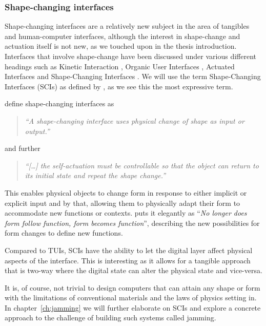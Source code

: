 \subsubsection{Shape-changing interfaces}
Shape-changing interfaces are a relatively new subject in the area of tangibles and human-computer interfaces, although the interest in shape-change and actuation itself is not new, as we touched upon in the thesis introduction.
Interfaces that involve shape-change have been discussed under various different headings such as Kinetic Interaction \citep{parkes2008designing}, Organic User Interfaces \citep{parkes2008designing,holman2008organic}, Actuated Interfaces \citep{poupyrev2007actuation} and Shape-Changing Interfaces \citep{coelho2011shape,rasmussen2012shape}.
We will use the term Shape-Changing Interfaces (SCIs) as defined by \citet{rasmussen2012shape}, as we see this the most expressive term.

\citeauthor{rasmussen2012shape} define shape-changing interfaces as
\begin{quotation}
  \emph{``A shape-changing interface uses physical change of shape as input or output.''}
\end{quotation}
and further
\begin{quotation}
  \emph{``[\ldots] the self-actuation must be controllable so that the object can return to its initial state and repeat the shape change.''}  
\end{quotation}

This enables physical objects to change form in response to either implicit or explicit input and by that, allowing them to physically adapt their form to accommodate new functions or contexts.
\citep{parkes2008designing} puts it elegantly as ``\emph{No longer does form follow function, form becomes function}'', describing the new possibilities for form changes to define new functions.

Compared to TUIs, SCIs have the ability to let the digital layer affect physical aspects of the interface.
This is interesting as it allows for a tangible approach that is two-way where the digital state can alter the physical state and vice-versa.

It is, of course, not trivial to design computers that can attain any shape or form with the limitations of conventional materials and the laws of physics setting in.
In chapter~\ref{ch:jamming} we will further elaborate on SCIs and explore a concrete approach to the challenge of building such systems called jamming.

